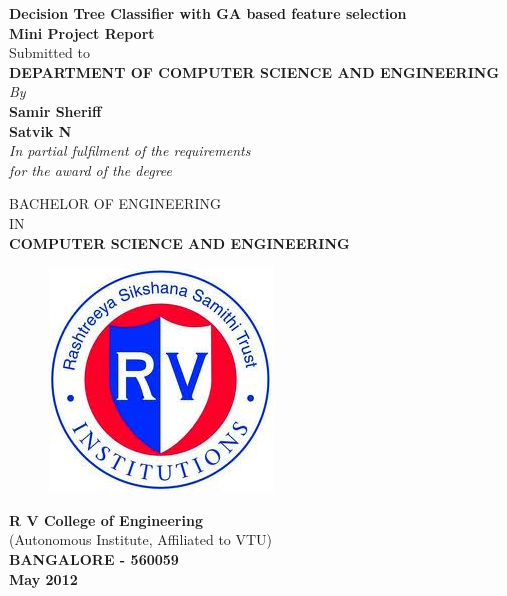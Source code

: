 \documentclass[12pt]{report}
\begin{document}
%

\begin{titlepage}
\begin{center}
{\bf \large Decision Tree Classifier with GA based feature selection}\\
\vspace{.15in}
{\bfseries Mini Project Report}\\
\vspace{.15in}
{\normalsize Submitted to} \\
\vspace{.1in}
{\bfseries DEPARTMENT OF COMPUTER SCIENCE AND ENGINEERING}\\
\vspace{.25in}
{\normalsize \emph{By}}\\
{\bfseries\normalsize Samir Sheriff }\\
{\bfseries\normalsize Satvik N }\\
\vspace{.25in}
{\normalsize \emph{In partial fulfilment of the requirements\\ for the award of the degree \\
\vspace{.15in}
} } 

\vspace{.15in}
{\large{BACHELOR OF ENGINEERING}}\\
\vspace{.15in}
{\normalsize{IN}}\\
\vspace{.15in}
{\bfseries\normalsize COMPUTER SCIENCE AND ENGINEERING}\\
\vspace{0.15in}

\begin{figure}[h!]
	\centering
		\includegraphics[scale=0.5]{RVCE.png}
		
\end{figure} 
\vspace{.25in}
{\bfseries\large R V College of Engineering}\\
{\normalsize (Autonomous Institute, Affiliated to VTU)}\\
{\bfseries\normalsize BANGALORE - 560059}\\ 
{\bfseries\large May 2012}
\end{center}
\end{titlepage}
\end{document}
